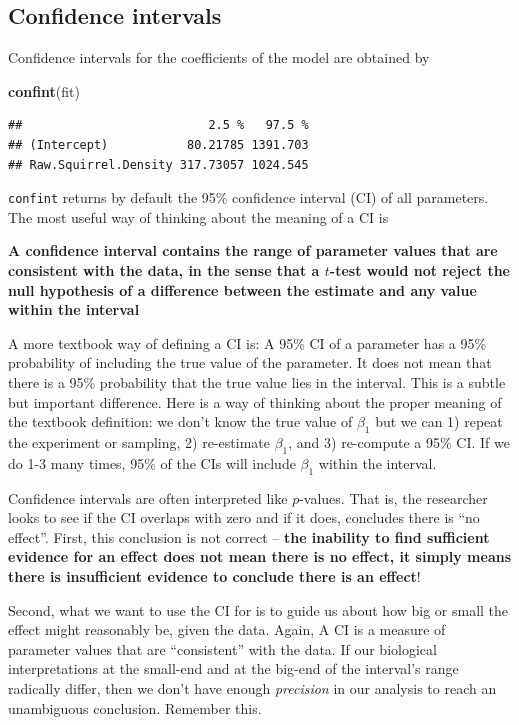 \documentclass[]{book}
\newenvironment{Shaded}{\begin{snugshade}}{\end{snugshade}}
\newcommand{\KeywordTok}[1]{\textcolor[rgb]{0.13,0.29,0.53}{\textbf{#1}}}
\newcommand{\NormalTok}[1]{#1}
\begin{document}
\subsection{Confidence intervals}\label{confidence-intervals}

Confidence intervals for the coefficients of the model are obtained by

\begin{Shaded}
\begin{Highlighting}[]
\KeywordTok{confint}\NormalTok{(fit)}
\end{Highlighting}
\end{Shaded}

\begin{verbatim}
##                          2.5 %   97.5 %
## (Intercept)           80.21785 1391.703
## Raw.Squirrel.Density 317.73057 1024.545
\end{verbatim}

\texttt{confint} returns by default the 95\% confidence interval (CI) of
all parameters. The most useful way of thinking about the meaning of a
CI is

\textbf{A confidence interval contains the range of parameter values
that are consistent with the data, in the sense that a \(t\)-test would
not reject the null hypothesis of a difference between the estimate and
any value within the interval}

A more textbook way of defining a CI is: A 95\% CI of a parameter has a
95\% probability of including the true value of the parameter. It does
not mean that there is a 95\% probability that the true value lies in
the interval. This is a subtle but important difference. Here is a way
of thinking about the proper meaning of the textbook definition: we
don't know the true value of \(\beta_1\) but we can 1) repeat the
experiment or sampling, 2) re-estimate \(\beta_1\), and 3) re-compute a
95\% CI. If we do 1-3 many times, 95\% of the CIs will include
\(\beta_1\) within the interval.

Confidence intervals are often interpreted like \(p\)-values. That is,
the researcher looks to see if the CI overlaps with zero and if it does,
concludes there is ``no effect''. First, this conclusion is not correct
-- \textbf{the inability to find sufficient evidence for an effect does
not mean there is no effect, it simply means there is insufficient
evidence to conclude there is an effect}!

Second, what we want to use the CI for is to guide us about how big or
small the effect might reasonably be, given the data. Again, A CI is a
measure of parameter values that are ``consistent'' with the data. If
our biological interpretations at the small-end and at the big-end of
the interval's range radically differ, then we don't have enough
\emph{precision} in our analysis to reach an unambiguous conclusion.
Remember this.
\end{document}
